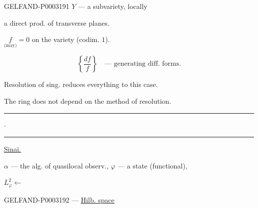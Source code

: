 \begin{GelfandAdjacentEvidence}{GELFAND-P000319}{1}
$Y$ --- a subvariety, locally





\end{GelfandAdjacentEvidence}


a direct prod. of transverse planes.

$\underset{\text{(may)}}{f}=0$ on the variety (codim. $1$).

\begin{equation*}\left\{\frac{df}{f}\right\}\quad\text{--- generating diff. forms.}\end{equation*}

Resolution of sing. reduces everything to this case.

The ring does not depend on the method of resolution.

\begin{center}\rule{20mm}{.6pt}\quad $\cdot$\quad\rule{20mm}{.6pt}\end{center}

\uline{\uline{Sinai.}}

$\alpha$ --- the alg. of quasilocal observ., $\varphi$ --- a state (functional),

$L_\varphi^2\longleftarrow$

\begin{GelfandAdjacentEvidence}{GELFAND-P000319}{2}
--- \uline{\uline{Hilb. space}}

\end{GelfandAdjacentEvidence}



